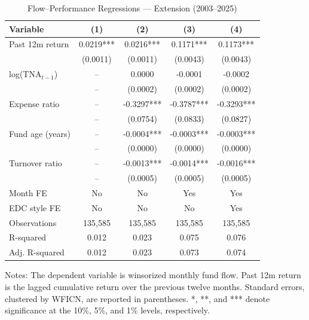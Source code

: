 \documentclass{article}
\begin{document}

\begin{table}[htbp]
\centering
\caption{Flow--Performance Regressions --- Extension (2003--2025)}
\label{tab:regression-extension}
\small
\begin{threeparttable}
\begin{tabular}{lcccc}
\toprule
Variable & (1) & (2) & (3) & (4) \\
\midrule
Past 12m return & 0.0219*** & 0.0216*** & 0.1171*** & 0.1173*** \\
 & (0.0011) & (0.0011) & (0.0043) & (0.0043) \\
log(TNA$_{t-1}$) & -- & 0.0000 & -0.0001 & -0.0002 \\
 & -- & (0.0002) & (0.0002) & (0.0002) \\
Expense ratio & -- & -0.3297*** & -0.3787*** & -0.3293*** \\
 & -- & (0.0754) & (0.0833) & (0.0827) \\
Fund age (years) & -- & -0.0004*** & -0.0003*** & -0.0003*** \\
 & -- & (0.0000) & (0.0000) & (0.0000) \\
Turnover ratio & -- & -0.0013*** & -0.0014*** & -0.0016*** \\
 & -- & (0.0005) & (0.0005) & (0.0005) \\
\midrule
Month FE & No & No & Yes & Yes \\
EDC style FE & No & No & No & Yes \\
Observations & 135,585 & 135,585 & 135,585 & 135,585 \\
R-squared & 0.012 & 0.023 & 0.075 & 0.076 \\
Adj. R-squared & 0.012 & 0.023 & 0.073 & 0.074 \\
\bottomrule
\end{tabular}
\begin{tablenotes}
\footnotesize
\item Notes: The dependent variable is winsorized monthly fund flow. Past 12m return is the lagged cumulative return over the previous twelve months. Standard errors, clustered by WFICN, are reported in parentheses. *, **, and *** denote significance at the 10\%, 5\%, and 1\% levels, respectively.
\end{tablenotes}
\end{threeparttable}
\end{table}
\end{document}
